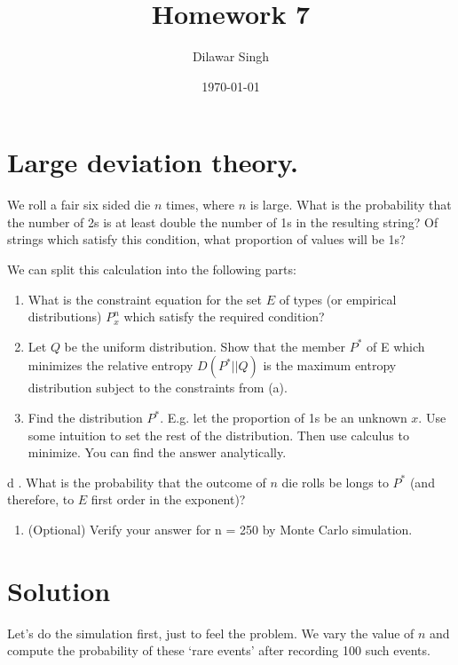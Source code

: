 \documentclass[]{article}
\title{Homework 7}
\author{Dilawar Singh}
\date{\today}
\providecommand{\tightlist}{%
\setlength{\itemsep}{0pt}\setlength{\parskip}{0pt}}
\begin{document}
\maketitle

\section{Large deviation theory.}\label{large-deviation-theory.}

We roll a fair six sided die \(n\) times, where \(n\) is large. What is
the probability that the number of 2s is at least double the number of
1s in the resulting string? Of strings which satisfy this condition,
what proportion of values will be 1s?

We can split this calculation into the following parts:

\begin{enumerate}
\def\labelenumi{\alph{enumi}.}
\item
  What is the constraint equation for the set \(E\) of types (or
  empirical distributions) \(P_x^n\) which satisfy the required
  condition?
\item
  Let \(Q\) be the uniform distribution. Show that the member \(P^*\) of
  E which minimizes the relative entropy \(D(P^*||Q)\) is the maximum
  entropy distribution subject to the constraints from (a).
\item
  Find the distribution \(P^*\). E.g. let the proportion of 1s be an
  unknown \(x\). Use some intuition to set the rest of the distribution.
  Then use calculus to minimize. You can find the answer analytically.
\end{enumerate}

d . What is the probability that the outcome of \(n\) die rolls be longs
to \(P^*\) (and therefore, to \(E\) first order in the exponent)?

\begin{enumerate}
\def\labelenumi{\alph{enumi}.}
\setcounter{enumi}{4}
\tightlist
\item
  (Optional) Verify your answer for n = 250 by Monte Carlo simulation.
\end{enumerate}

\section{Solution}\label{solution}

Let's do the simulation first, just to feel the problem. We vary the
value of \(n\) and compute the probability of these `rare events' after
recording 100 such events.
\end{document}
